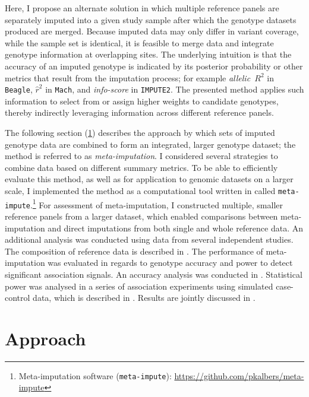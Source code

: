 Here, I propose an alternate solution in which multiple reference panels are separately imputed into a given study sample after which the genotype datasets produced are merged.
Because imputed data may only differ in variant coverage, while the sample set is identical, it is feasible to merge data and integrate genotype information at overlapping sites.
The underlying intuition is that the accuracy of an imputed genotype is indicated by its posterior probability or other metrics that result from the imputation process; for example \emph{allelic~$R^{2}$} in \texttt{Beagle}, \emph{$\hat{r}^{2}$} in \texttt{Mach}, and \emph{info-score} in \texttt{IMPUTE2}.
The presented method applies such information to select from or assign higher weights to candidate genotypes, thereby indirectly leveraging information across different reference panels.

The following section (\ref{sec:metaimpdescr}) describes the approach by which sets of imputed genotype data are combined to form an integrated, larger genotype dataset; the method is referred to as \emph{meta-imputation}.
I considered several strategies to combine data based on different summary metrics.
To be able to efficiently evaluate this method, as well as for application to genomic datasets on a larger scale, I implemented the method as a computational tool written in \cpp called \texttt{meta-impute}.\footnote{Meta-imputation software (\texttt{meta-impute}): \url{https://github.com/pkalbers/meta-impute}}
For assessment of meta-imputation, I constructed multiple, smaller reference panels from a larger dataset, which enabled comparisons between meta-imputation and direct imputations from both single and whole reference data.
An additional analysis was conducted using data from several independent studies.
The composition of reference data is described in .
The performance of meta-imputation was evaluated in regards to genotype accuracy and power to detect significant association signals.
An accuracy analysis was conducted in .
Statistical power was analysed in a series of association experiments using simulated case-control data, which is described in .
Results are jointly discussed in .




%
\section{Approach}
\label{sec:metaimpdescr}
%

